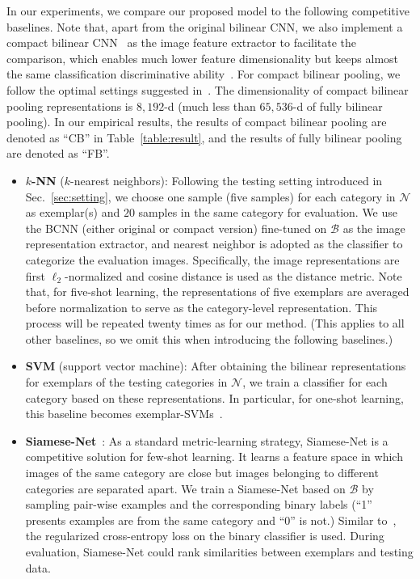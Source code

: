 \documentclass[10pt,twocolumn,letterpaper]{article}
\begin{document}
In our experiments, we compare our proposed model to the following competitive baselines. Note that, apart from the original bilinear CNN, we also implement a compact bilinear CNN~\cite{CB16CVPR} as the image feature extractor to facilitate the comparison, which enables much lower feature dimensionality but keeps almost the same classification discriminative ability~\cite{CB16CVPR}. For compact bilinear pooling, we follow the optimal settings suggested in~\cite{CB16CVPR}. The dimensionality of compact bilinear pooling representations is $8,192$-d (much less than $65,536$-d of fully bilinear pooling). In our empirical results, the results of compact bilinear pooling are denoted as ``CB'' in Table~\ref{table:result}, and the results of fully bilinear pooling are denoted as ``FB''.

\begin{itemize}
\item \textbf{$k$-NN} ($k$-nearest neighbors): Following the testing setting introduced in Sec.~\ref{sec:setting}, we choose one sample (five samples) for each category in $\mathcal{N}$ as exemplar(s) and $20$ samples in the same category for evaluation. We use the BCNN (either original or compact version) fine-tuned on $\mathcal{B}$ as the image representation extractor, and nearest neighbor is adopted as the classifier to categorize the evaluation images. Specifically, the image representations are first $\ell_2$-normalized and cosine distance is used as the distance metric. Note that, for five-shot learning, the representations of five exemplars are averaged before normalization to serve as the category-level representation. This process will be repeated twenty times as for our method. (This applies to all other baselines, so we omit this when introducing the following baselines.)

\item \textbf{SVM} (support vector machine): After obtaining the bilinear representations for exemplars of the testing categories in $\mathcal{N}$, we train a classifier for each category based on these representations. In particular, for one-shot learning, this baseline becomes exemplar-SVMs~\cite{exemplarSVM11ICCV}.

\item \textbf{Siamese-Net}~\cite{siamese16ICML}: As a standard metric-learning strategy, Siamese-Net is a competitive solution for few-shot learning. It learns a feature space in which images of the same category are close but images belonging to different categories are separated apart. We train a Siamese-Net based on $\mathcal{B}$ by sampling pair-wise examples and the corresponding binary labels (``1'' presents examples are from the same category and ``0'' is not.) Similar to~\cite{siamese16ICML}, the regularized cross-entropy loss on the binary classifier is used. During evaluation, Siamese-Net could rank similarities between exemplars and testing data.


\end{itemize}
\end{document}
